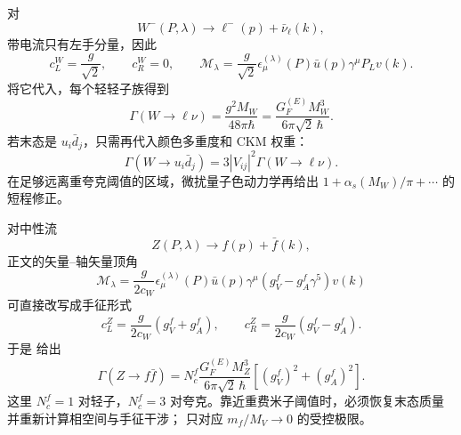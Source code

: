 对
\begin{equation*}
W^-(P,\lambda)\to\ell^-(p)+\bar\nu_\ell(k),
\end{equation*}
带电流只有左手分量，因此
\begin{equation}
 c_L^{W}=\frac{g}{\sqrt2},\qquad c_R^{W}=0,
 \qquad
 \mathcal M_\lambda
 =\frac{g}{\sqrt2}\epsilon_\mu^{(\lambda)}(P)
 \bar u(p)\gamma^\mu P_Lv(k).
 \label{eq:wlnu-amplitude-dp11}
\end{equation}
将它代入，每个轻轻子族得到
\begin{equation}
\boxed{
\Gamma(W\to\ell\nu)
=\frac{g^2M_W}{48\pi\hbar}
=\frac{G_F^{(E)}M_W^3}{6\pi\sqrt2\,\hbar}.}
\label{eq:w-leptonic-width-dp11}
\end{equation}
若末态是 $u_i\bar d_j$，只需再代入颜色多重度和 CKM 权重：
\begin{equation*}
\Gamma(W\to u_i\bar d_j)
=3|V_{ij}|^2\Gamma(W\to\ell\nu).
\end{equation*}
在足够远离重夸克阈值的区域，微扰量子色动力学再给出 $1+\alpha_s(M_W)/\pi+\cdots$ 的短程修正。

对中性流
\begin{equation*}
Z(P,\lambda)\to f(p)+\bar f(k),
\end{equation*}
正文的矢量--轴矢量顶角
\begin{equation}
\mathcal M_\lambda
=\frac{g}{2c_W}\epsilon_\mu^{(\lambda)}(P)
\bar u(p)\gamma^\mu(g_V^f-g_A^f\gamma^5)v(k)
\label{eq:zff-amplitude-width-dp11}
\end{equation}
可直接改写成手征形式
\begin{equation*}
 c_L^Z=\frac{g}{2c_W}(g_V^f+g_A^f),\qquad
 c_R^Z=\frac{g}{2c_W}(g_V^f-g_A^f).
\end{equation*}
于是 给出
\begin{equation}
\boxed{
\Gamma(Z\to f\bar f)
=N_c^f\frac{G_F^{(E)}M_Z^3}{6\pi\sqrt2\,\hbar}
\left[(g_V^f)^2+(g_A^f)^2\right].}
\label{eq:zff-width-tree-dp11}
\end{equation}
这里 $N_c^f=1$ 对轻子，$N_c^f=3$ 对夸克。靠近重费米子阈值时，必须恢复末态质量并重新计算相空间与手征干涉； 只对应 $m_f/M_V\to0$ 的受控极限。

